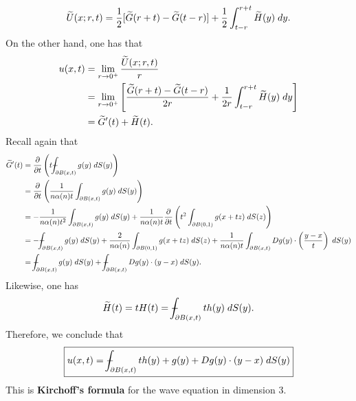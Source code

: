 \documentclass{article}
\def\Xint#1{\mathchoice
	{\XXint\displaystyle\textstyle{#1}}%
	{\XXint\textstyle\scriptstyle{#1}}%
	{\XXint\scriptstyle\scriptscriptstyle{#1}}%
	{\XXint\scriptscriptstyle\scriptscriptstyle{#1}}%
	\!\int}
\def\XXint#1#2#3{{\setbox0=\hbox{$#1{#2#3}{\int}$ }
		\vcenter{\hbox{$#2#3$ }}\kern-0.6\wd0}}
\def\dashint{\Xint-}
\begin{document}
\begin{equation*}
	\widetilde{U}(x; r, t) = \frac{1}{2}[\widetilde{G}(r + t) - \widetilde{G}(t - r)] + \frac{1}{2}\int_{t -r}^{r + t}\widetilde{H}(y)\;dy. 
\end{equation*}
On the other hand, one has that 
\begin{align*}
	\begin{split}
		u(x, t) &= \lim_{r \to 0^{+}}\frac{\widetilde{U}(x; r, t)}{r} \\
		&= \lim_{r \to 0^{+}}\left[\frac{\widetilde{G}(r + t) - \widetilde{G}(t - r)}{2r} + \frac{1}{2r}\int_{t - r}^{r + t}\widetilde{H}(y)\;dy\right] \\
		&= \widetilde{G}'(t) + \widetilde{H}(t). 
	\end{split}
\end{align*}
Recall again that 
\begin{align}
	\begin{split}
		\ti{G}'(t) &= \frac{\partial}{\partial t}\left(t\dashint_{\partial B(x, t)}g(y)\;dS(y)\right) \\
		&= \frac{\partial}{\partial t}\left(\frac{1}{n\alpha(n)t}\int_{\partial B(x ,t)}g(y)\;dS(y)\right) \\
		&= -\frac{1}{n\alpha(n)t^{2}}\int_{\partial B(x,t)}g(y)\;dS(y) + \frac{1}{n\alpha(n)t}\frac{\partial}{\partial t}\left(t^{2}\int_{\partial B(0,1)}g(x + tz)\;dS(z)\right) \\
		&= -\dashint_{\partial B(x, t)}g(y)\;dS(y) + \frac{2}{n\alpha(n)}\int_{\partial B(0,1)}g(x + tz)\;dS(z) + \frac{1}{n\alpha(n)t}\int_{\partial B(x, t)}Dg(y) \cdot \left(\frac{y - x}{t}\right)\;dS(y) \\
		&= \dashint_{\partial B(x, t)}g(y)\;dS(y) + \dashint_{\partial B(x, t)}Dg(y) \cdot (y - x)\;dS(y). 
	\end{split}
\end{align}
Likewise, one has 
\begin{equation*}
	\ti{H}(t) = tH(t) = \dashint_{\partial B(x, t)}th(y)\;dS(y). 
\end{equation*}
Therefore, we conclude that 
\begin{equation}
	\boxed{u(x, t) = \dashint_{\partial B(x, t)}th(y) + g(y) + Dg(y) \cdot (y - x)\;dS(y)}\label{eq:Kirchoff}
\end{equation}
This is \textbf{Kirchoff's formula} for the wave equation in dimension 3.
\end{document}
